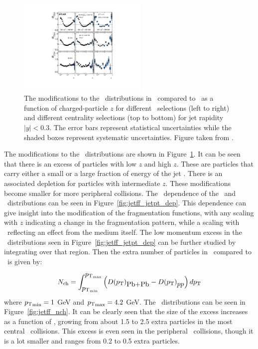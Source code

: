 \begin{figure}[htbp]
\begin{center}
\includegraphics[width=0.55\textwidth]{figures/jetMeasurements/jetff_rdz}
\caption{The modifications to the \Dz\ distributions in \pbpb\ compared to \pp\ as a function of charged-particle $z$ for different \ptjet\ selections (left to right) and different centrality selections (top to bottom) for jet rapidity $|y| < 0.3$.
The error bars represent statistical uncertainties while the shaded boxes represent systematic uncertainties.
Figure taken from \cite{PhysRevC.98.024908}.}
\label{fig:jetff_rdz}
\end{center}
\end{figure}

The modifications to the \Dz\ distributions are shown in Figure~\ref{fig:jetff_rdz}.
It can be seen that there is an excess of particles with low $z$ and high $z$.
These are particles that carry either a small or a large fraction of energy of the jet \pt.
There is an associated depletion for particles with intermediate $z$.
These modifications become smaller for more peripheral collisions.
The \ptjet\ dependence of the \Rdz\ and \Rdpt\ distributions can be seen in Figure~\ref{fig:jetff_jetpt_dep}.
This dependence can give insight into the modification of the fragmentation functions, with any scaling with $z$ indicating a change in the fragmentation pattern, while a scaling with \pt\ reflecting an effect from the medium itself.
The low momentum excess in the \Rdpt\ distributions seen in Figure~\ref{fig:jetff_jetpt_dep} can be further studied by integrating over that region.
Then the extra number of particles in \pbpb\ compared to \pp\ is given by:

\begin{align}
\mbox{$N_{\mathrm{ch}}$} = \int^{\mbox{$p_{\mathrm{T}}$}_{\mathrm{max}}}_{\mbox{$p_{\mathrm{T}}$}_{\mathrm{min}}} \left( \mbox{$D(\mbox{$p_{\mathrm{T}}$})$}_{\mbox{Pb+Pb}} - \mbox{$D(\mbox{$p_{\mathrm{T}}$})$}_{\mbox{$pp$}} \right) d\mbox{$p_{\mathrm{T}}$}
\end{align}
where $\mbox{$p_{\mathrm{T}}$}_{\mathrm{min}} = 1$ GeV and $\mbox{$p_{\mathrm{T}}$}_{\mathrm{max}} = 4.2$ GeV.
The \Nch\ distributions can be seen in Figure~\ref{fig:jetff_nch}.
It can be clearly seen that the size of the excess increases as a function of \ptjet, growing from about 1.5 to 2.5 extra particles in the most central \pbpb\ collisions.
This excess is even seen in the peripheral \pbpb\ collisions, though it is a lot smaller and ranges from 0.2 to 0.5 extra particles.




